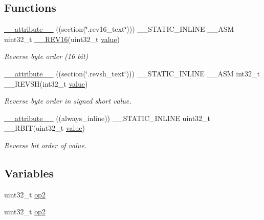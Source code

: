 \subsection*{Functions}
\begin{DoxyCompactItemize}
\item 
\hyperlink{group___c_m_s_i_s___core___instruction_interface_gae84a2733711339c5eefeb0d899506b96}{\+\_\+\+\_\+attribute\+\_\+\+\_\+} ((section(\char`\"{}.rev16\+\_\+text\char`\"{}))) \+\_\+\+\_\+\+S\+T\+A\+T\+I\+C\+\_\+\+I\+N\+L\+I\+NE \+\_\+\+\_\+\+A\+SM uint32\+\_\+t \hyperlink{group___c_m_s_i_s___core___instruction_interface_ga4e3acd41e7667cdf65ffcd8c76a8613f}{\+\_\+\+\_\+\+R\+E\+V16}(uint32\+\_\+t \hyperlink{semihosting_8h_aacce635d68067370c70caa2381ea1040}{value})
\begin{DoxyCompactList}\small\item\em Reverse byte order (16 bit) \end{DoxyCompactList}\item 
\hyperlink{group___c_m_s_i_s___core___instruction_interface_ga8e7a866927d3257a82b884ad14dbef4c}{\+\_\+\+\_\+attribute\+\_\+\+\_\+} ((section(\char`\"{}.revsh\+\_\+text\char`\"{}))) \+\_\+\+\_\+\+S\+T\+A\+T\+I\+C\+\_\+\+I\+N\+L\+I\+NE \+\_\+\+\_\+\+A\+SM int32\+\_\+t \+\_\+\+\_\+\+R\+E\+V\+SH(int32\+\_\+t \hyperlink{semihosting_8h_aacce635d68067370c70caa2381ea1040}{value})
\begin{DoxyCompactList}\small\item\em Reverse byte order in signed short value. \end{DoxyCompactList}\item 
\hyperlink{group___c_m_s_i_s___core___instruction_interface_gade0870dc150fccdf0a5ae2d3300b2954}{\+\_\+\+\_\+attribute\+\_\+\+\_\+} ((always\+\_\+inline)) \+\_\+\+\_\+\+S\+T\+A\+T\+I\+C\+\_\+\+I\+N\+L\+I\+NE uint32\+\_\+t \+\_\+\+\_\+\+R\+B\+IT(uint32\+\_\+t \hyperlink{semihosting_8h_aacce635d68067370c70caa2381ea1040}{value})
\begin{DoxyCompactList}\small\item\em Reverse bit order of value. \end{DoxyCompactList}\end{DoxyCompactItemize}
\subsection*{Variables}
\begin{DoxyCompactItemize}
\item 
uint32\+\_\+t \hyperlink{group___c_m_s_i_s___core___instruction_interface_gadb2bb33809b6f35ba4d176cbec7c7b75}{op2}
\item 
uint32\+\_\+t \hyperlink{group___c_m_s_i_s___core___instruction_interface_gadb2bb33809b6f35ba4d176cbec7c7b75}{op2}
\end{DoxyCompactItemize}


